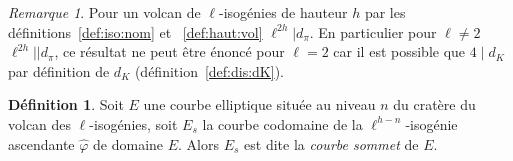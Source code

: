 \documentclass[10pt,a4paper]{book}
\theoremstyle{plain}
\theoremstyle{definition}
\theoremstyle{definition}
\theoremstyle{definition}
\theoremstyle{definition}
\theoremstyle{definition}
\newtheorem{defi}[thm]{Définition}
\theoremstyle{remark}
\newtheorem{rem}[thm]{Remarque}
\theoremstyle{remark}
\theoremstyle{definition}
\begin{document}
\begin{rem} 
\label{rem:lie:dp:dk}
Pour un volcan de $\ell$-isogénies de hauteur $h$ par les 
définitions~\ref{def:iso:nom} et ~\ref{def:haut:vol} $\ell^{2h} | d_{\pi}$.
En particulier pour $\ell \neq 2$ $\ell^{2h}||d_{\pi}$, ce résultat ne peut être 
énoncé  pour $\ell=2$ car il est possible que $4 \mid d_K$ par définition de $d_K$
(définition~\ref{def:dis:dK}).
\end{rem}

\begin{defi}
\label{def:cou:som}
Soit $E$ une courbe elliptique située au niveau $n$ du cratère du volcan des $\ell$-isogénies, soit $E_s$ la courbe codomaine de la $\ell^{h-n}$-isogénie ascendante $\widehat{\varphi}$ de domaine $E$. Alors $E_s$ est dite la \emph{courbe sommet} de $E$. 
\end{defi}
\end{document}
